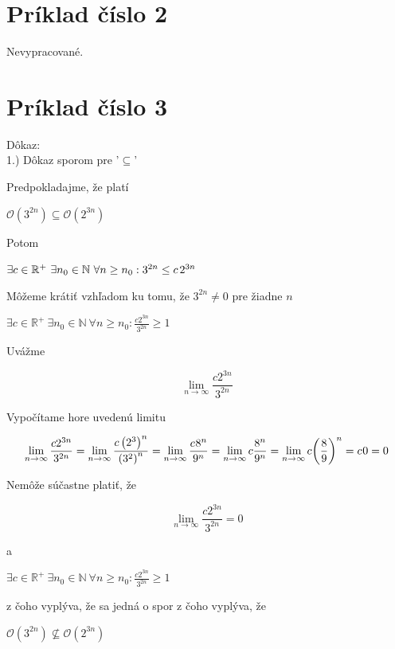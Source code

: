 \documentclass[11pt,a4paper]{article}
\begin{document}
\newpage
\section{Príklad číslo 2}

Nevypracované.

\newpage
\section{Príklad číslo 3}

Dôkaz:\\[-0.5em]

\hspace{5mm}1.) Dôkaz sporom pre '$\subseteq$'

\begin{flushright}
\begin{minipage}{0.92\textwidth}
  Predpokladajme, že platí
  \begin{center}
    $\mathcal{O}(3^{2n}) \subseteq \mathcal{O}(2^{3n})$
  \end{center}
  Potom
  \begin{center}
    $\exists c \in \mathbb{R}^{+} \ \exists n_{0} \in \mathbb{N} \ \forall n \geq n_{0}: 3^{2n} \leq c\hspace{0.5mm}2^{3n}$
  \end{center}
  Môžeme krátiť vzhľadom ku tomu, že $3^{2n} \neq 0$ pre žiadne $n$
  \begin{center}
    $\exists c \in \mathbb{R}^{+} \ \exists n_{0} \in \mathbb{N} \ \forall n \geq n_{0}: \frac{c2^{3n}}{3^{2n}} \geq 1$
  \end{center}
  Uvážme\\[-3.5em]
  \begin{center}
    $$\lim_{n\to\infty} \frac{c2^{3n}}{3^{2n}}$$
  \end{center}
  Vypočítame hore uvedenú limitu\\[-3.5em]
  \begin{center}
    $$\lim_{n\to\infty} \frac{c2^{3n}}{3^{2n}} = \lim_{n\to\infty} \frac{c\left(2^3\right)^n}{\left(3^2\right)^n} = \lim_{n\to\infty} \frac{c\hspace{0.2mm}8^n}{9^n} = \lim_{n\to\infty} c\frac{8^n}{9^n} = \lim_{n\to\infty} c{\left({\frac{8}{9}}\right)}^n = c\hspace{0.2mm}0 = 0$$
  \end{center}
  Nemôže súčastne platiť, že\\[-3.5em]
  \begin{center}
    $$\lim_{n\to\infty} \frac{c2^{3n}}{3^{2n}} = 0$$
  \end{center}
  a
  \begin{center}
    $\exists c \in \mathbb{R}^{+} \ \exists n_{0} \in \mathbb{N} \ \forall n \geq n_{0}: \frac{c2^{3n}}{3^{2n}} \geq 1$
  \end{center}
  z čoho vyplýva, že sa jedná o spor z čoho vyplýva, že
  \begin{center}
    $\mathcal{O}(3^{2n}) \nsubseteq \mathcal{O}(2^{3n})$
  \end{center}
\end{minipage}
\end{flushright}
\end{document}
